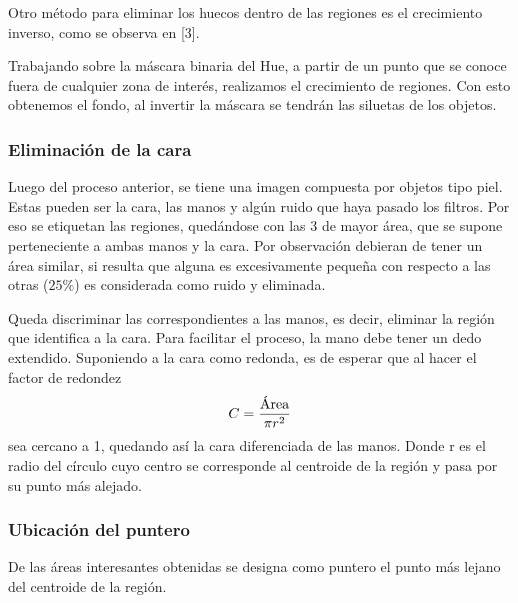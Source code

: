 \documentclass[portrait,a0paper,fontscale=0.277]{baposter}
\begin{document}
\begin{poster}
{			 Otro método  para  eliminar  los  huecos  dentro  de  las  regiones  es  el
			crecimiento inverso, como se observa en [3].

			Trabajando sobre la máscara binaria del Hue, a partir de  un  punto  que  se
			conoce fuera de cualquier zona de  interés,  realizamos  el  crecimiento  de
			regiones. Con esto obtenemos el fondo, al invertir  la  máscara  se  tendrán
			las siluetas de los objetos.

		\subsubsection*{Eliminación de la cara}

			Luego del proceso anterior, se tiene una imagen compuesta por  objetos  tipo
			piel. Estas pueden ser la cara, las manos y algún ruido que haya pasado  los
			filtros. Por eso se etiquetan las  regiones, quedándose con las 3  de  mayor
			área, que se supone perteneciente a ambas manos y la cara.  Por  observación
			debieran de tener un área similar, si resulta que  alguna  es  excesivamente
			pequeña con respecto a  las  otras  ($25 \%$)  es  considerada  como  ruido  y
			eliminada.

			Queda discriminar las correspondientes a las manos, es decir, eliminar la
			región que identifica a la cara. Para facilitar el proceso, la mano debe
			tener un dedo extendido. Suponiendo a la cara como redonda, es de esperar
			que al hacer el factor de  redondez
			\[ C = \frac{\makebox{Área}}{\pi r^2}\]
			sea cercano a 1, quedando así la cara diferenciada de las manos. Donde r  es
			el radio del círculo cuyo centro se corresponde al centroide de la región  y
			pasa por su punto más alejado.
		\subsubsection*{Ubicación del puntero}
De las áreas interesantes obtenidas se designa como puntero el punto más lejano del centroide de la región.

	}



\end{poster}
\end{document}
